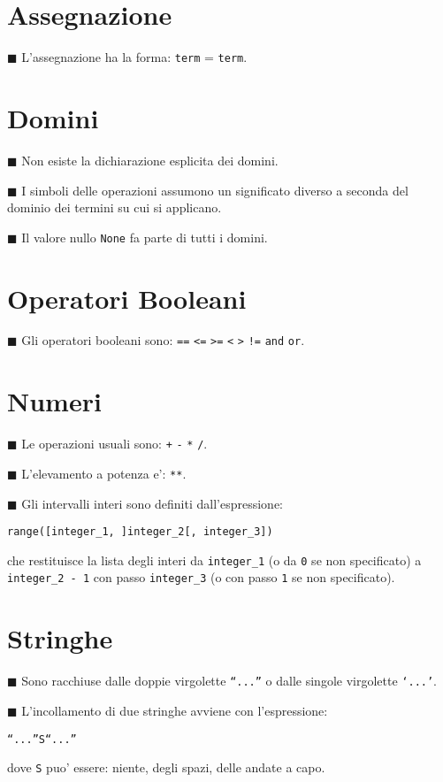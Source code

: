 \documentclass[a4paper,12pt,fleqn,leqno,twoside]{article}
\newcommand{\tw}{\texttt} %
\newcommand{\bbox}{{\scriptsize $\blacksquare$}} %
\newcommand{\skipline}{\vspace{\baselineskip}} %
\newcommand{\bitem}[1]{\bbox \; #1\par \skipline}
\begin{document}
\section{Assegnazione}

\bitem{L'assegnazione ha la forma: \tw{term} = \tw{term}.}

\section{Domini}

\bitem{Non esiste la dichiarazione esplicita dei domini.}

\bitem{I simboli delle operazioni assumono un significato diverso a seconda del dominio dei termini su cui si applicano.}

\bitem{Il valore nullo \tw{None} fa parte di tutti i domini.}

\section{Operatori Booleani}

\bitem{Gli operatori booleani sono: \tw{==} \tw{<=} \tw{>=} \tw{<} \tw{>} \tw{!=} \tw{and} \tw{or}.}

\section{Numeri}

\bitem{Le operazioni usuali sono: \tw{+} \tw{-} \tw{*} \tw{/}.}

\bitem{L'elevamento a potenza e': \tw{**}.}

\bitem{Gli intervalli interi sono definiti dall'espressione:\par
\tw{range([integer\_1, ]integer\_2[, integer\_3])}\par
che restituisce la lista degli interi da \tw{integer\_1} (o da \tw{0} se non specificato) a \tw{integer\_2 - 1} con passo \tw{integer\_3} (o con passo \tw{1} se non specificato).}

\section{Stringhe}

\bitem{Sono racchiuse dalle doppie virgolette \tw{``...''} o dalle singole virgolette \tw{`...'}.}

\bitem{L'incollamento di due stringhe avviene con l'espressione:\par
\tw{``...''S``...''}\par
dove \tw{S} puo' essere: niente, degli spazi, delle andate a capo.}
\end{document}

